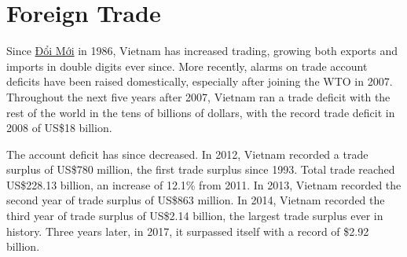 \documentclass[openany]{book}
\begin{document}
\section{Foreign Trade}
Since \href{https://en.wikipedia.org/wiki/%C4%90%E1%BB%95i_M%E1%BB%9Bi}{Đổi Mới} in 1986, Vietnam has increased trading, growing both exports and imports in double digits ever since. More recently, alarms on trade account deficits have been raised domestically, especially after joining the WTO in 2007. Throughout the next five years after 2007, Vietnam ran a trade deficit with the rest of the world in the tens of billions of dollars, with the record trade deficit in 2008 of US\$18 billion.\cite{97}

The account deficit has since decreased. In 2012, Vietnam recorded a trade surplus of US\$780 million, the first trade surplus since 1993. Total trade reached US\$228.13 billion, an increase of 12.1\% from 2011.\cite{108} \small In 2013, Vietnam recorded the second year of trade surplus of US\$863 million. In 2014, Vietnam recorded the third year of trade surplus of US\$2.14 billion, the largest trade surplus ever in history.\cite{109} Three years later, in 2017, it surpassed itself with a record of \$2.92 billion.
\end{document}
